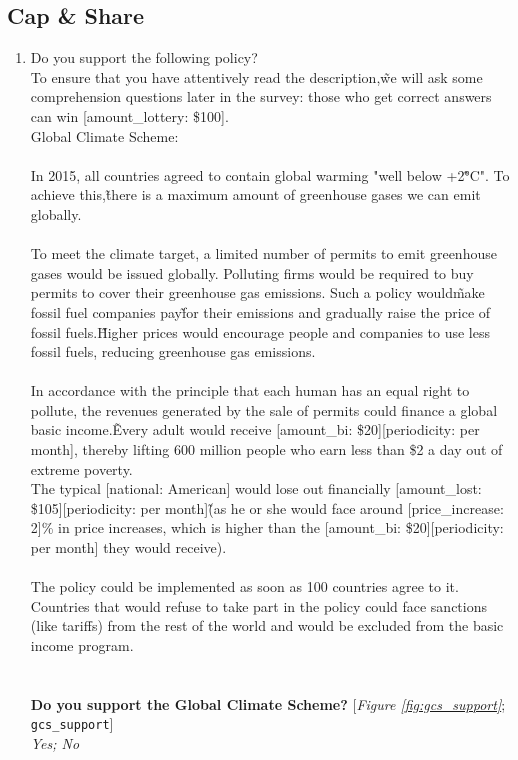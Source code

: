  \subsection*{Cap & Share} 
 \begin{enumerate}[resume] 
\item  \label{q:gcs_support} Do you support the following policy?\\
To ensure that you have attentively read the description,\~we will ask some comprehension questions later in the survey: those who get correct answers can win [amount\_lottery: \$100].
\\
Global Climate Scheme:\~\\\\
In 2015, all countries agreed to contain global warming "well below +2\~°C". To achieve this,\~there is a maximum amount of greenhouse gases we can emit globally.\~\\\\
To meet the climate target, a limited number of permits to emit greenhouse gases would be issued globally. Polluting firms would be required to buy permits to cover their greenhouse gas emissions. Such a policy would\~make fossil fuel companies pay\~for their emissions and gradually raise the price of fossil fuels.\~Higher prices would encourage people and companies to use less fossil fuels, reducing greenhouse gas emissions.\\\\
In accordance with the principle that each human has an equal right to pollute, the revenues generated by the sale of permits could finance a global basic income.\~Every adult would receive [amount\_bi: \$20][periodicity: per month], thereby lifting 600 million people who earn less than \$2 a day out of extreme poverty.\\
The typical [national: American] would lose out financially [amount\_lost: \$105][periodicity: per month]\~(as he or she would face around [price\_increase: 2]\% in price increases, which is higher than the [amount\_bi: \$20][periodicity: per month] they would receive).\\\\
The policy could be implemented as soon as 100 countries agree to it. Countries that would refuse to take part in the policy could face sanctions (like tariffs) from the rest of the world and would be excluded from the basic income program.\\\\
\\\textbf{
Do you support the Global Climate Scheme?
} [\textit{Figure \ref{fig:gcs_support}}; 
\verb|gcs_support|]
  \\ \textit{Yes; No}


\end{enumerate}
